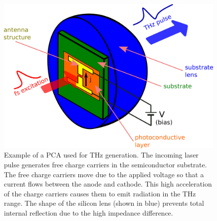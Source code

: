 \begin{figure}[H]
    \centering
    \includegraphics[scale=0.5]{images/TDS/PCA.png}
    \caption{Example of a PCA used for THz generation. The incoming laser pulse generates free charge carriers in the semiconductor substrate. The free charge carriers move due to the applied voltage so that a current flows between the anode and cathode. This high acceleration of the charge carriers causes them to emit radiation in the THz range. The shape of the silicon lens (shown in blue) prevents total internal reflection due to the high impedance difference.}
    \label{fig:PCA}
\end{figure}

